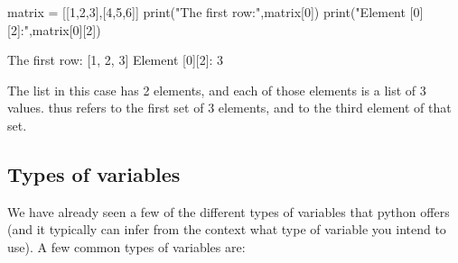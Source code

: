 \begin{python}[caption = Two dimensional lists]
matrix = [[1,2,3],[4,5,6]]
print("The first row:",matrix[0])
print("Element [0][2]:",matrix[0][2])
\end{python}
\begin{poutput}
The first row: [1, 2, 3]
Element [0][2]: 3
\end{poutput}
The  list in this case has 2 elements, and each of those elements is a list of 3 values.  thus refers to the first set of 3 elements, and  to the third element of that set. 

\subsection{Types of variables}
We have already seen a few of the different types of variables that python offers (and it typically can infer from the context what type of variable you intend to use). A few common types of variables are:
